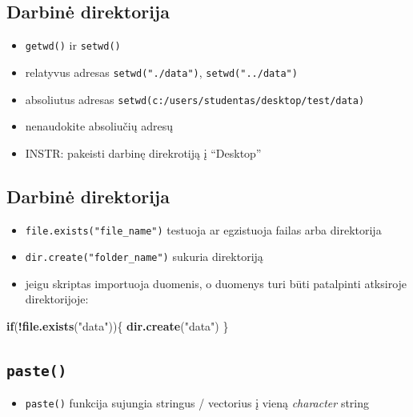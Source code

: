 \documentclass[]{article}
\newenvironment{Shaded}{\begin{snugshade}}{\end{snugshade}}
\newcommand{\KeywordTok}[1]{\textcolor[rgb]{0.13,0.29,0.53}{\textbf{#1}}}
\newcommand{\StringTok}[1]{\textcolor[rgb]{0.31,0.60,0.02}{#1}}
\newcommand{\ControlFlowTok}[1]{\textcolor[rgb]{0.13,0.29,0.53}{\textbf{#1}}}
\newcommand{\OperatorTok}[1]{\textcolor[rgb]{0.81,0.36,0.00}{\textbf{#1}}}
\newcommand{\NormalTok}[1]{#1}
\providecommand{\tightlist}{%
  \setlength{\itemsep}{0pt}\setlength{\parskip}{0pt}}
\begin{document}
\subsection{Darbinė direktorija}\label{darbine-direktorija}

\begin{itemize}
\tightlist
\item
  \texttt{getwd()} ir \texttt{setwd()}
\item
  relatyvus adresas \texttt{setwd("./data")}, \texttt{setwd("../data")}
\item
  absoliutus adresas
  \texttt{setwd(c:/users/studentas/desktop/test/data)}
\item
  nenaudokite absoliučių adresų
\item
  INSTR: pakeisti darbinę direkrotiją į ``Desktop''
\end{itemize}

\subsection{Darbinė direktorija}\label{darbine-direktorija-1}

\begin{itemize}
\tightlist
\item
  \texttt{file.exists("file\_name")} testuoja ar egzistuoja failas arba
  direktorija
\item
  \texttt{dir.create("folder\_name")} sukuria direktoriją
\item
  jeigu skriptas importuoja duomenis, o duomenys turi būti patalpinti
  atksiroje direktorijoje:
\end{itemize}

\begin{Shaded}
\begin{Highlighting}[]
\ControlFlowTok{if}\NormalTok{(}\OperatorTok{!}\KeywordTok{file.exists}\NormalTok{(}\StringTok{"data"}\NormalTok{))\{}
        \KeywordTok{dir.create}\NormalTok{(}\StringTok{"data"}\NormalTok{)}
\NormalTok{\}}
\end{Highlighting}
\end{Shaded}

\subsection{\texorpdfstring{\texttt{paste()}}{paste()}}\label{paste}

\begin{itemize}
\tightlist
\item
  \texttt{paste()} funkcija sujungia stringus / vectorius į vieną
  \emph{character} string
\end{itemize}
\end{document}

